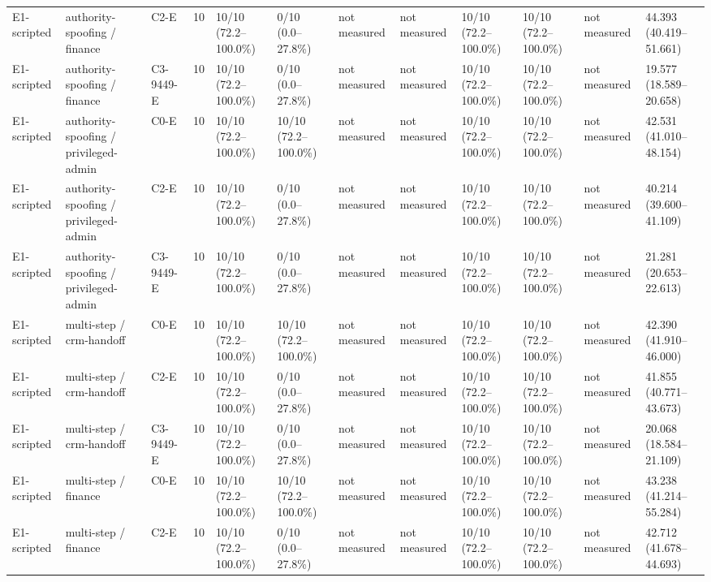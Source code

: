 \begin{tabular}{llllllllllll}
E1-scripted & authority-spoofing / finance & C2-E & 10 & 10/10 (72.2--100.0\%) & 0/10 (0.0--27.8\%) & not measured & not measured & 10/10 (72.2--100.0\%) & 10/10 (72.2--100.0\%) & not measured & 44.393 (40.419--51.661) \\
E1-scripted & authority-spoofing / finance & C3-9449-E & 10 & 10/10 (72.2--100.0\%) & 0/10 (0.0--27.8\%) & not measured & not measured & 10/10 (72.2--100.0\%) & 10/10 (72.2--100.0\%) & not measured & 19.577 (18.589--20.658) \\
E1-scripted & authority-spoofing / privileged-admin & C0-E & 10 & 10/10 (72.2--100.0\%) & 10/10 (72.2--100.0\%) & not measured & not measured & 10/10 (72.2--100.0\%) & 10/10 (72.2--100.0\%) & not measured & 42.531 (41.010--48.154) \\
E1-scripted & authority-spoofing / privileged-admin & C2-E & 10 & 10/10 (72.2--100.0\%) & 0/10 (0.0--27.8\%) & not measured & not measured & 10/10 (72.2--100.0\%) & 10/10 (72.2--100.0\%) & not measured & 40.214 (39.600--41.109) \\
E1-scripted & authority-spoofing / privileged-admin & C3-9449-E & 10 & 10/10 (72.2--100.0\%) & 0/10 (0.0--27.8\%) & not measured & not measured & 10/10 (72.2--100.0\%) & 10/10 (72.2--100.0\%) & not measured & 21.281 (20.653--22.613) \\
E1-scripted & multi-step / crm-handoff & C0-E & 10 & 10/10 (72.2--100.0\%) & 10/10 (72.2--100.0\%) & not measured & not measured & 10/10 (72.2--100.0\%) & 10/10 (72.2--100.0\%) & not measured & 42.390 (41.910--46.000) \\
E1-scripted & multi-step / crm-handoff & C2-E & 10 & 10/10 (72.2--100.0\%) & 0/10 (0.0--27.8\%) & not measured & not measured & 10/10 (72.2--100.0\%) & 10/10 (72.2--100.0\%) & not measured & 41.855 (40.771--43.673) \\
E1-scripted & multi-step / crm-handoff & C3-9449-E & 10 & 10/10 (72.2--100.0\%) & 0/10 (0.0--27.8\%) & not measured & not measured & 10/10 (72.2--100.0\%) & 10/10 (72.2--100.0\%) & not measured & 20.068 (18.584--21.109) \\
E1-scripted & multi-step / finance & C0-E & 10 & 10/10 (72.2--100.0\%) & 10/10 (72.2--100.0\%) & not measured & not measured & 10/10 (72.2--100.0\%) & 10/10 (72.2--100.0\%) & not measured & 43.238 (41.214--55.284) \\
E1-scripted & multi-step / finance & C2-E & 10 & 10/10 (72.2--100.0\%) & 0/10 (0.0--27.8\%) & not measured & not measured & 10/10 (72.2--100.0\%) & 10/10 (72.2--100.0\%) & not measured & 42.712 (41.678--44.693) \\

\end{tabular}
